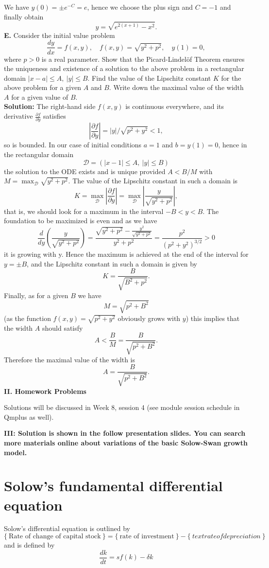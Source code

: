 \documentclass[11pt,a4paper]{article}
\begin{document}
	We have $y(0) = \pm e^{-C}=e$, hence we choose the plus sign and $C = -1$ and finally obtain
	$$
	y = \sqrt{e^{2(x+1)}-x^2}.
	$$
	\textbf{E.} Consider the initial value problem
	$$
	\frac{dy}{dx} =f(x, y), \quad f(x, y) = \sqrt{y^2+p^2},\quad y(1) = 0,
	$$
	where $p > 0$ is a real parameter. Show that the Picard-Lindel\"{o}f Theorem ensures the uniqueness and existence of a solution to the above problem in a rectangular domain $|x-a|\leq A,\ |y|\leq B$. Find the value of the Lipschitz constant $K$ for the above problem for a given $A$ and $B$. Write down the maximal value of the width $A$ for a given value of $B$.\\
	\textbf{Solution:} The right-hand side $f(x, y)$ is continuous everywhere, and its derivative $\frac{\partial f}{\partial y}$ satisfies
	$$
	\left\lvert \frac{\partial f}{\partial y}\right\rvert = |y|/\sqrt{p^2 + y^2} <1, 
	$$
	so is bounded. In our case of initial conditions $a = 1$ and $b = y(1) = 0$, hence in the rectangular domain
	$$
	\mathcal{D} = (|x-1|\leq A,\ |y|\leq B)
	$$
	the solution to the ODE exists and is unique provided $A < B/M$ with $M=\max_\mathcal{D}\sqrt{y^2+p^2}$. The value of the Lipschitz constant in such a domain is
	$$
	K
	= \max_\mathcal{D} \left\lvert \frac{\partial f}{\partial y}\right\rvert
	= \max_\mathcal{D}\left\lvert \frac{y}{\sqrt{y^2+p^2}}\right\rvert,  
	$$
	that is, we should look for a maximum in the interval $-B<y<B$. The foundation to be maximized is even and as we have
	$$
	\frac{d}{dy}\left(\frac{y}{\sqrt{y^2+p^2}}\right)
	= \frac{\sqrt{y^2+p^2}-\frac{y^2}{\sqrt{y^2+p^2}}}{y^2+p^2}
	= \frac{p^2}{(p^2+y^2)^{3/2}} > 0
	$$
	it is growing with y. Hence the maximum is achieved at the end of the interval for $y = \pm B$, and the Lipschitz constant in such a domain is given by
	$$
	K = \frac{B}{\sqrt{B^2+p^2}}.
	$$
	Finally, as for a given $B$ we have
	$$
	M = \sqrt{p^2 + B^2}
	$$
	(as the function $f(x,y) = \sqrt{p^2+y^2}$ obviously grows with $y$) this implies that the width $A$ should satisfy
	$$
	A < \frac{B}{M} = \frac{B}{\sqrt{p^2+B^2}}.
	$$
	Therefore the maximal value of the width is
	$$
	A = \frac{B}{\sqrt{p^2 + B^2}}.
	$$
	\textbf{II. Homework Problems}\par
	Solutions will be discussed in Week 8, session 4 (see module session schedule in Qmplus as well).\par
	\textbf{III: Solution is shown in the follow presentation slides. You can search more
	materials online about variations of the basic Solow-Swan growth model.}
	\section*{Solow’s fundamental differential equation}
	Solow’s differential equation is outlined by
	\begin{equation}
		\{\ \text{Rate of change of capital stock}\ \} = \{\ \text{rate of investment}\ \} - \{\ text{rate of depreciation}\ \}
	\end{equation}
	and is defined by
	\begin{equation}
		\frac{dk}{dt} = sf(k) - \delta k
	\end{equation}
\end{document}
